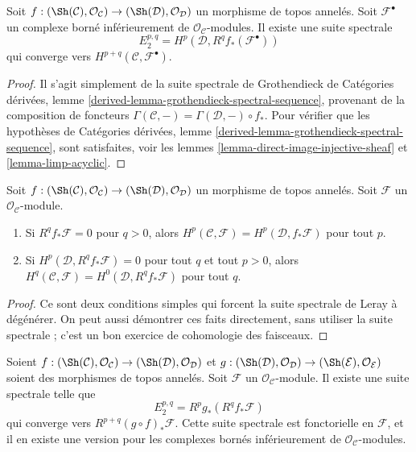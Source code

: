 \begin{lemma}
\label{lemma-Leray}
Soit $f : (\Sh(\mathcal{C}), \mathcal{O}_\mathcal{C}) \to
(\Sh(\mathcal{D}), \mathcal{O}_\mathcal{D})$ un morphisme de topos annelés.
Soit $\mathcal{F}^\bullet$ un complexe borné inférieurement de
$\mathcal{O}_\mathcal{C}$-modules. Il existe une suite spectrale
$$
E_2^{p, q} = H^p(\mathcal{D}, R^qf_*(\mathcal{F}^\bullet))
$$
qui converge vers $H^{p + q}(\mathcal{C}, \mathcal{F}^\bullet)$.
\end{lemma}

\begin{proof}
Il s'agit simplement de la suite spectrale de Grothendieck de Catégories
dérivées, lemme \ref{derived-lemma-grothendieck-spectral-sequence}, provenant
de la composition de foncteurs
$\Gamma(\mathcal{C}, -) = \Gamma(\mathcal{D}, -) \circ f_*$.
Pour vérifier que les hypothèses de Catégories dérivées,
lemme \ref{derived-lemma-grothendieck-spectral-sequence}, sont satisfaites,
voir les lemmes \ref{lemma-direct-image-injective-sheaf} et
\ref{lemma-limp-acyclic}.
\end{proof}

\begin{lemma}
\label{lemma-apply-Leray}
Soit $f : (\Sh(\mathcal{C}), \mathcal{O}_\mathcal{C}) \to
(\Sh(\mathcal{D}), \mathcal{O}_\mathcal{D})$ un morphisme de topos annelés.
Soit $\mathcal{F}$ un $\mathcal{O}_\mathcal{C}$-module.
\begin{enumerate}
\item Si $R^qf_*\mathcal{F} = 0$ pour $q > 0$, alors
$H^p(\mathcal{C}, \mathcal{F}) = H^p(\mathcal{D}, f_*\mathcal{F})$ pour tout
$p$.
\item Si $H^p(\mathcal{D}, R^qf_*\mathcal{F}) = 0$ pour tout $q$ et tout
$p > 0$, alors
$H^q(\mathcal{C}, \mathcal{F}) = H^0(\mathcal{D}, R^qf_*\mathcal{F})$ pour
tout $q$.
\end{enumerate}
\end{lemma}

\begin{proof}
Ce sont deux conditions simples qui forcent la suite spectrale de Leray à
dégénérer. On peut aussi démontrer ces faits directement, sans utiliser la
suite spectrale ; c'est un bon exercice de cohomologie des faisceaux.
\end{proof}

\begin{lemma}
\label{lemma-relative-Leray}
Soient
$f : (\Sh(\mathcal{C}), \mathcal{O}_\mathcal{C}) \to
(\Sh(\mathcal{D}), \mathcal{O}_\mathcal{D})$
et
$g : (\Sh(\mathcal{D}), \mathcal{O}_\mathcal{D}) \to
(\Sh(\mathcal{E}), \mathcal{O}_\mathcal{E})$
soient des morphismes de topos annelés.
Soit $\mathcal{F}$ un $\mathcal{O}_\mathcal{C}$-module.
Il existe une suite spectrale telle que
$$
E_2^{p, q} = R^pg_*(R^qf_*\mathcal{F})
$$
qui converge vers $R^{p + q}(g \circ f)_*\mathcal{F}$.
Cette suite spectrale est fonctorielle en $\mathcal{F}$, et il en existe une
version pour les complexes bornés inférieurement de
$\mathcal{O}_\mathcal{C}$-modules.
\end{lemma}


